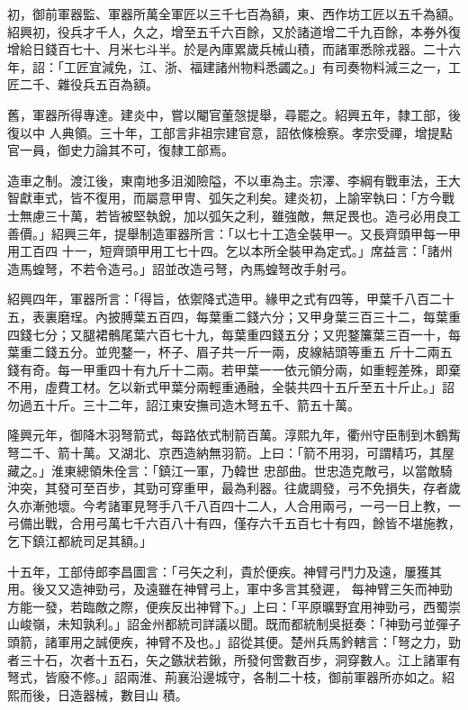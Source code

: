 \begin{pinyinscope}
 初，御前軍器監、軍器所萬全軍匠以三千七百為額，東、西作坊工匠以五千為額。紹興初，役兵才千人，久之，增至五千六百餘，又於諸道增二千九百餘，本券外復增給日錢百七十、月米七斗半。於是內庫累歲兵械山積，而諸軍悉除戎器。二十六年，詔：「工匠宜減免，江、浙、福建諸州物料悉蠲之。」有司奏物料減三之一，工匠二千、雜役兵五百為額。



 舊，軍器所得專達。建炎中，嘗以閹官董愨提舉，尋罷之。紹興五年，隸工部，後復以中
 人典領。三十年，工部言非祖宗建官意，詔依條檢察。孝宗受禪，增提點官一員，御史力論其不可，復隸工部焉。



 造車之制。渡江後，東南地多沮洳險隘，不以車為主。宗澤、李綱有戰車法，王大智獻車式，皆不復用，而屬意甲冑、弧矢之利矣。建炎初，上諭宰執曰：「方今戰士無慮三十萬，若皆被堅執銳，加以弧矢之利，雖強敵，無足畏也。造弓必用良工善價。」紹興三年，提舉制造軍器所言：「以七十工造全裝甲一。又長齊頭甲每一甲用工百四
 十一，短齊頭甲用工七十四。乞以本所全裝甲為定式。」席益言：「諸州造馬蝗弩，不若令造弓。」詔並改造弓弩，內馬蝗弩改手射弓。



 紹興四年，軍器所言：「得旨，依禦降式造甲。緣甲之式有四等，甲葉千八百二十五，表裏磨珵。內披膊葉五百四，每葉重二錢六分；又甲身葉三百三十二，每葉重四錢七分；又腿裙鶻尾葉六百七十九，每葉重四錢五分；又兜鍪簾葉三百一十，每葉重二錢五分。並兜鍪一，杯子、眉子共一斤一兩，皮線結頭等重五
 斤十二兩五錢有奇。每一甲重四十有九斤十二兩。若甲葉一一依元領分兩，如重輕差殊，即棄不用，虛費工材。乞以新式甲葉分兩輕重通融，全裝共四十五斤至五十斤止。」詔勿過五十斤。三十二年，詔江東安撫司造木弩五千、箭五十萬。



 隆興元年，御降木羽弩箭式，每路依式制箭百萬。淳熙九年，衢州守臣制到木鶴觜弩二千、箭十萬。又湖北、京西造納無羽箭。上曰：「箭不用羽，可謂精巧，其屋藏之。」淮東總領朱佺言：「鎮江一軍，乃韓世
 忠部曲。世忠造克敵弓，以當敵騎沖突，其發可至百步，其勁可穿重甲，最為利器。往歲調發，弓不免損失，存者歲久亦漸弛壞。今考諸軍見弩手八千八百四十二人，人合用兩弓，一弓一日上教，一弓備出戰，合用弓萬七千六百八十有四，僅存六千五百七十有四，餘皆不堪施教，乞下鎮江都統司足其額。」



 十五年，工部侍郎李昌圖言：「弓矢之利，貴於便疾。神臂弓鬥力及遠，屢獲其用。後又又造神勁弓，及遠雖在神臂弓上，軍中多言其發遲，
 每神臂三矢而神勁方能一發，若臨敵之際，便疾反出神臂下。」上曰：「平原曠野宜用神勁弓，西蜀崇山峻嶺，未知孰利。」詔金州都統司詳議以聞。既而都統制吳挺奏：「神勁弓並彈子頭箭，諸軍用之誠便疾，神臂不及也。」詔從其便。楚州兵馬鈐轄言：「弩之力，勁者三十石，次者十五石，矢之鏃狀若鍬，所發何啻數百步，洞穿數人。江上諸軍有弩式，皆廢不修。」詔兩淮、荊襄沿邊城守，各制二十枝，御前軍器所亦如之。紹熙而後，日造器械，數目山
 積。




\end{pinyinscope}
